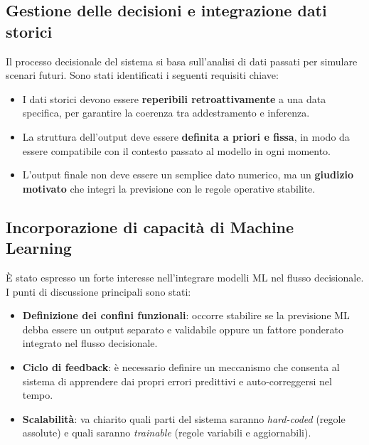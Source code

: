 \documentclass[12pt, a4paper]{article}
\begin{document}
\subsection{Gestione delle decisioni e integrazione dati storici}

Il processo decisionale del sistema si basa sull'analisi di dati passati per simulare scenari futuri. Sono stati identificati i seguenti requisiti chiave:

\begin{itemize}[leftmargin=1.5cm]
  \item I dati storici devono essere \textbf{reperibili retroattivamente} a una data specifica, per garantire la coerenza tra addestramento e inferenza.
  \item La struttura dell'output deve essere \textbf{definita a priori e fissa}, in modo da essere compatibile con il contesto passato al modello in ogni momento.
  \item L'output finale non deve essere un semplice dato numerico, ma un \textbf{giudizio motivato} che integri la previsione con le regole operative stabilite.
\end{itemize}

\subsection{Incorporazione di capacità di Machine Learning}

È stato espresso un forte interesse nell'integrare modelli ML nel flusso decisionale. I punti di discussione principali sono stati:

\begin{itemize}[leftmargin=1.5cm]
  \item \textbf{Definizione dei confini funzionali}: occorre stabilire se la previsione ML debba essere un output separato e validabile oppure un fattore ponderato integrato nel flusso decisionale.
  \item \textbf{Ciclo di feedback}: è necessario definire un meccanismo che consenta al sistema di apprendere dai propri errori predittivi e auto-correggersi nel tempo.
  \item \textbf{Scalabilità}: va chiarito quali parti del sistema saranno \textit{hard-coded} (regole assolute) e quali saranno \textit{trainable} (regole variabili e aggiornabili).
\end{itemize}

\vspace{0.5cm}

\end{document}
